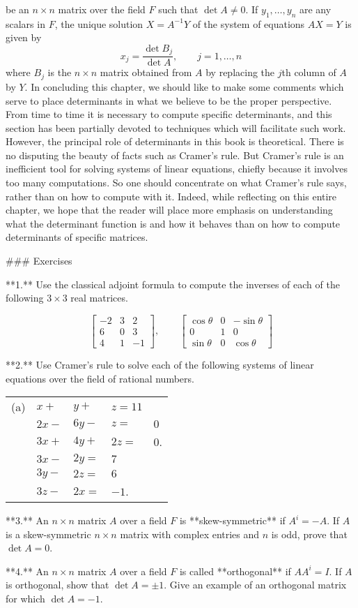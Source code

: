 be an \(n\times n\) matrix over the field \(F\) such that \(\det A\neq 0\). If \(y_{1},\ldots,y_{n}\) are any scalars in \(F\), the unique solution \(X=A^{-1}Y\) of the system of equations \(AX=Y\) is given by \[x_{j}=\frac{\det B_{j}}{\det A},\qquad j=1,\ldots,n\] where \(B_{j}\) is the \(n\times n\) matrix obtained from \(A\) by replacing the \(j\)th column of \(A\) by \(Y\). In concluding this chapter, we should like to make some comments which serve to place determinants in what we believe to be the proper perspective. From time to time it is necessary to compute specific determinants, and this section has been partially devoted to techniques which will facilitate such work. However, the principal role of determinants in this book is theoretical. There is no disputing the beauty of facts such as Cramer's rule. But Cramer's rule is an inefficient tool for solving systems of linear equations, chiefly because it involves too many computations. So one should concentrate on what Cramer's rule says, rather than on how to compute with it. Indeed, while reflecting on this entire chapter, we hope that the reader will place more emphasis on understanding what the determinant function is and how it behaves than on how to compute determinants of specific matrices.

### Exercises

**1.** Use the classical adjoint formula to compute the inverses of each of the following \(3\times 3\) real matrices.

\[\left[\begin{array}{rrr}-2&3&2\\ 6&0&3\\ 4&1&-1\end{array}\right],\qquad\left[\begin{array}{rrr}\cos\theta&0&-\sin \theta\\ 0&1&0\\ \sin\theta&0&\cos\theta\end{array}\right]\]

**2.** Use Cramer's rule to solve each of the following systems of linear equations over the field of rational numbers.

\begin{tabular}{l l l l} (a) & \(x+\) & \(y+\) & \(z=11\) \\  & \(2x-\) & \(6y-\) & \(z=\) & \(0\) \\  & \(3x+\) & \(4y+\) & \(2z=\) & \(0\). \\  & \(3x-\) & \(2y=\) & \(7\) \\  & \(3y-\) & \(2z=\) & \(6\) \\  & \(3z-\) & \(2x=\) & \(-1\). \\ \end{tabular}

**3.** An \(n\times n\) matrix \(A\) over a field \(F\) is **skew-symmetric** if \(A^{i}=-A\). If \(A\) is a skew-symmetric \(n\times n\) matrix with complex entries and \(n\) is odd, prove that \(\det A=0\).

**4.** An \(n\times n\) matrix \(A\) over a field \(F\) is called **orthogonal** if \(AA^{i}=I\). If \(A\) is orthogonal, show that \(\det A=\pm 1\). Give an example of an orthogonal matrix for which \(\det A=-1\).

 